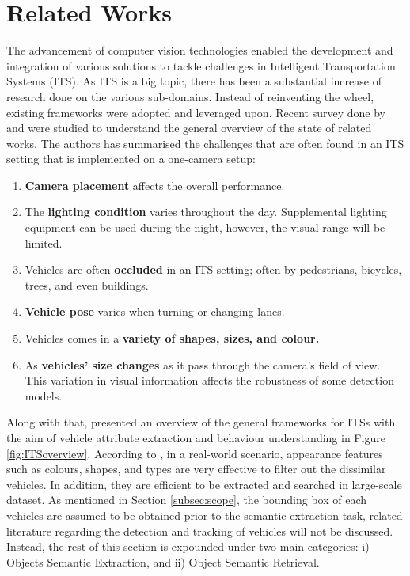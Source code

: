 \section{Related Works}
\label{section:relatedworks}

The advancement of computer vision technologies enabled the development and
integration of various solutions to tackle challenges in Intelligent
Transportation Systems (ITS). As ITS is a big topic, there has been a
substantial increase of research done on the various sub-domains.
Instead of reinventing the wheel, existing frameworks were adopted and
leveraged upon. Recent survey done by  and
 were studied to understand the general overview of
the state of related works. The authors has summarised the challenges that are
often found in an ITS setting that is implemented on a one-camera setup:
\begin{enumerate}
 \item \textbf{Camera placement} affects the overall performance.
 \item The \textbf{lighting condition} varies throughout the day. Supplemental lighting equipment can be used during the night, however, the visual range will be limited.
  \item Vehicles are often \textbf{occluded} in an ITS setting; often by pedestrians, bicycles, trees, and even buildings.
 \item \textbf{Vehicle pose} varies when turning or changing lanes.
 \item Vehicles comes in a \textbf{variety of shapes, sizes, and colour.}
 \item As \textbf{vehicles' size changes} as it pass through the camera's field of view. This variation in visual information affects the robustness of some detection models.
\end{enumerate}
Along with that,  presented an overview of the
general frameworks for ITSs with the aim of vehicle attribute extraction and
behaviour understanding in Figure \ref{fig:ITSoverview}. According to
, in a real-world scenario, appearance features such as
colours, shapes, and types are very effective to filter out the dissimilar
vehicles. In addition, they are efficient to be extracted and searched in
large-scale dataset. As mentioned in Section \ref{subsec:scope}, the
bounding box of each vehicles are assumed to be obtained prior to the semantic
extraction task, related literature regarding the detection and tracking of
vehicles will not be discussed. Instead, the rest of this section is
expounded under two main categories: i) Objects Semantic Extraction, and
ii) Object Semantic Retrieval.


